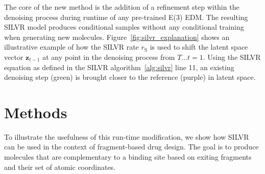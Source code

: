 \documentclass[journal=jacsat,manuscript=article]{achemso}
\begin{document}
The core of the new method is the addition of a refinement step within the denoising process during runtime of any pre-trained E(3) EDM. The resulting SILVR model produces conditional samples without any conditional training when generating new molecules. Figure~\ref{fig:silvr_explanation} shows an illustrative example of how the SILVR rate $r_{\mathrm{S}}$ is used to shift the latent space vector $\mathbf{z}_{t-1}$ at any point in the denoising process from $T\ldots t=1$. Using the SILVR equation as defined in the SILVR algorithm~\ref{alg:silvr} line 11, an existing denoising step (green) is brought closer to the reference (purple) in latent space. 

\section{Methods}
To illustrate the usefulness of this run-time modification, we show how SILVR can be used in the context of fragment-based drug design. The goal is to produce molecules that are complementary to a binding site based on exiting fragments and their set of atomic coordinates. 
\end{document}

